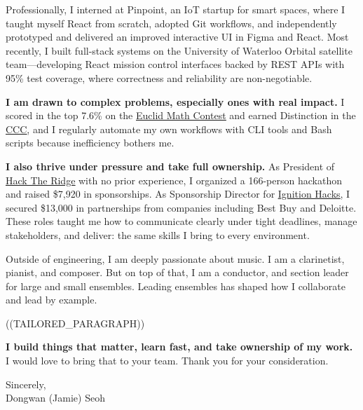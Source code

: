 \documentclass[11pt,a4paper]{article}
\begin{document}
\vspace{6pt}

Professionally, I interned at Pinpoint, an IoT startup for smart spaces, where I taught myself React from scratch,
adopted Git workflows, and independently prototyped and delivered an improved interactive UI in Figma and React.
Most recently, I built full-stack systems on the University of Waterloo Orbital satellite team---developing
React mission control interfaces backed by REST APIs with 95\% test coverage, where correctness
and reliability are non-negotiable.

\vspace{6pt}

\textbf{I am drawn to complex problems, especially ones with real impact.}
I scored in the top 7.6\% on the \underline{\href{https://cemc.uwaterloo.ca/contests/euclid}{Euclid Math Contest}} and earned Distinction in the \underline{\href{https://cemc.uwaterloo.ca/contests/ccc}{CCC}},
and I regularly automate my own workflows with CLI tools and Bash scripts because inefficiency bothers me.

\vspace{6pt}

\textbf{I also thrive under pressure and take full ownership.}
As President of \underline{\href{https://hacktheridge.ca/}{Hack The Ridge}} with no prior experience, I organized a 166-person hackathon and raised \$7,920 in
sponsorships. As Sponsorship Director for \underline{\href{https://ignitionhacks.org}{Ignition Hacks}}, I secured \$13,000 in partnerships from companies
including Best Buy and Deloitte. These roles taught me how to communicate clearly under tight deadlines,
manage stakeholders, and deliver: the same skills I bring to every environment.

\vspace{6pt}

Outside of engineering, I am deeply passionate about music. I am a clarinetist, pianist, and composer. But on top of that, I am a conductor, and section leader for large and small ensembles.
Leading ensembles has shaped how I collaborate and lead by example.

\vspace{6pt}

((TAILORED_PARAGRAPH))

\vspace{6pt}

\textbf{I build things that matter, learn fast, and take ownership of my work.}
\\I would love to bring that to your team. Thank you for your consideration.

\vspace{15pt}

Sincerely,\\
Dongwan (Jamie) Seoh
\end{document}
